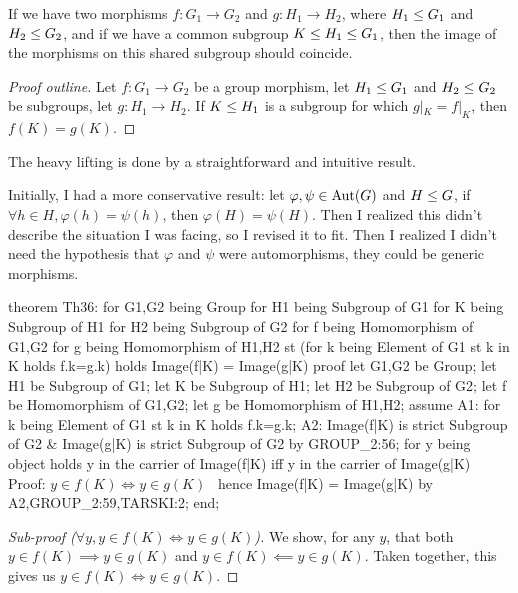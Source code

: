 \begin{theorem}
If we have two morphisms $f\colon G_{1}\to G_{2}$ and $g\colon H_{1}\to
H_{2}$, where $H_{1}\leq G_{1}$ and $H_{2}\leq G_{2}$, and if
we have a common subgroup $K\leq H_{1}\leq G_{1}$, then the
image of the morphisms on this shared subgroup should coincide.
\end{theorem}

\begin{proof}[Proof outline]
  Let $f\colon G_{1}\to G_{2}$ be a group morphism, let $H_{1}\leq G_{1}$
  and $H_{2}\leq G_{2}$ be subgroups, let $g\colon H_{1}\to H_{2}$.
  If $K\leq H_{1}$ is a subgroup for which $g|_{K}=f|_{K}$, then $f(K)=g(K)$.
\end{proof}


\begin{thm-remark}
The heavy lifting is done by a straightforward and intuitive result.

Initially, I had a more conservative result: let $\varphi,\psi\in\operatorname{Aut}(G)$
and $H\leq G$, if $\forall h\in H,\varphi(h)=\psi(h)$, then
$\varphi(H)=\psi(H)$. Then I realized this didn't describe the situation
I was facing, so I revised it to fit. Then I realized I didn't need the
hypothesis that $\varphi$ and $\psi$ were automorphisms, they could be
generic morphisms.
\end{thm-remark}

\nwenddocs{}\endmoddef\nwstartdeflinemarkup{}\nwenddeflinemarkup
theorem Th36:
  for G1,G2 being Group
  for H1 being Subgroup of G1
  for K being Subgroup of H1
  for H2 being Subgroup of G2
  for f being Homomorphism of G1,G2
  for g being Homomorphism of H1,H2
  st (for k being Element of G1 st k in K holds f.k=g.k)
  holds Image(f|K) = Image(g|K)
proof
  let G1,G2 be Group;
  let H1 be Subgroup of G1;
  let K be Subgroup of H1;
  let H2 be Subgroup of G2;
  let f be Homomorphism of G1,G2;
  let g be Homomorphism of H1,H2;
  assume A1: for k being Element of G1 st k in K holds f.k=g.k;
  A2: Image(f|K) is strict Subgroup of G2 &
      Image(g|K) is strict Subgroup of G2 by GROUP_2:56;
  for y being object
  holds y in the carrier of Image(f|K) iff y in the carrier of Image(g|K)
  \LA{}Proof: $y\in f(K)\iff y\in g(K)$~{\nwtagstyle{}}\RA{}
  hence Image(f|K) = Image(g|K) by A2,GROUP_2:59,TARSKI:2;
end;
\eatline
{}\nwendcode{}\nwdocspar
\begin{proof}[Sub-proof ($\forall y,y\in f(K)\iff y\in g(K)$)]
  We show, for any $y$, that both $y\in f(K)\implies y\in g(K)$ and
  $y\in f(K)\impliedby y\in g(K)$. Taken together, this gives us
  $y\in f(K)\iff y\in g(K)$.
\end{proof}

